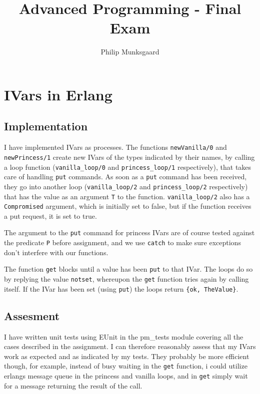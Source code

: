 \documentclass [10pt,a4paper]{article}
\title{Advanced Programming - Final Exam}
\author{Philip Munksgaard}
\newcommand{\erlang}[1]{\texttt{#1}}
\begin{document}
\maketitle

\section{IVars in Erlang}

\subsection{Implementation}

I have implemented IVars as processes. The functions
\erlang{newVanilla/0} and \erlang{newPrincess/1} create new IVars of
the types indicated by their names, by calling a loop function
(\erlang{vanilla\_loop/0} and \erlang{princess\_loop/1} respectively),
that takes care of handling \erlang{put} commands. As soon as a
\erlang{put} command has been received, they go into another loop
(\erlang{vanilla\_loop/2} and \erlang{princess\_loop/2} respectively)
that has the value as an argument \erlang{T} to the
function. \erlang{vanilla\_loop/2} also has a \erlang{Compromised}
argument, which is initially set to false, but if the function
receives a put request, it is set to true.

The argument to the \erlang{put} command for princess IVars are of
course tested against the predicate \erlang{P} before assignment, and
we use \erlang{catch} to make sure exceptions don't interfere with our
functions.

The function \erlang{get} blocks until a value has been \erlang{put}
to that IVar. The loops do so by replying the value \erlang{notset},
whereupon the \erlang{get} function tries again by calling itself. If
the IVar has been set (using \erlang{put}) the loops return
\erlang{\{ok, TheValue\}}.

\subsection{Assesment}

I have written unit tests using EUnit in the pm\_tests module covering
all the cases described in the assignment. I can therefore reasonably
assess that my IVars work as expected and as indicated by my
tests. They probably be more efficient though, for example, instead of
busy waiting in the \erlang{get} function, i could utilize erlangs
message queue in the princess and vanilla loops, and in \erlang{get}
simply wait for a message returning the result of the call.
\end{document}

